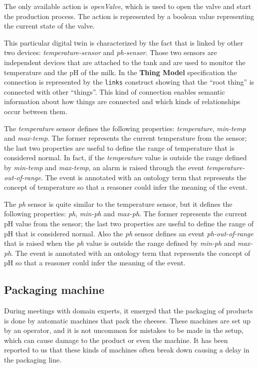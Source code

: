 The only available action is \textit{openValve}, which is used to open the valve and start the production process. The action is represented by a boolean value representing the current state of the valve.

This particular digital twin is characterized by the fact that is linked by other two devices: \textit{temperature-sensor} and \textit{ph-sensor}.
Those two sensors are independent devices that are attached to the tank and are used to monitor the temperature and the pH of the milk.
In the \textbf{Thing Model} specification the connection is represented by the \texttt{links} construct showing that the ``root thing'' is connected
with other ``things''.
This kind of connection enables semantic information about how things are connected and which kinds of relationships occur between them.

The \textit{temperature} sensor defines the following properties: \textit{temperature}, \textit{min-temp} and \textit{max-temp}. The former represents the current temperature from the sensor; the last two properties are useful to define the range of temperature that is considered normal.
In fact, if the \textit{temperature} value is outside the range defined by \textit{min-temp} and \textit{max-temp}, an alarm is raised through the event \textit{temperature-out-of-range}. The event is annotated with an ontology term that represents the concept of temperature so that a reasoner
could infer the meaning of the event.

The \textit{ph} sensor is quite similar to the temperature sensor, but it defines the following properties: \textit{ph}, \textit{min-ph} and \textit{max-ph}. The former represents the current pH value from the sensor; the last two properties are useful to define the range of pH that is considered normal. Also the \textit{ph} sensor defines an event \textit{ph-out-of-range} that is raised when the \textit{ph} value is outside the range defined by \textit{min-ph} and \textit{max-ph}.
The event is annotated with an ontology term that represents the concept of pH so that a reasoner could infer the meaning of the event.

\subsection{Packaging machine}
During meetings with domain experts, it emerged that the packaging of products is done by automatic machines that pack the cheeses.
These machines are set up by an operator, and it is not uncommon for mistakes to be made in the setup, which can cause damage to the product or even
the machine. It has been reported to us that these kinds of machines often break down causing a delay in the packaging line.

